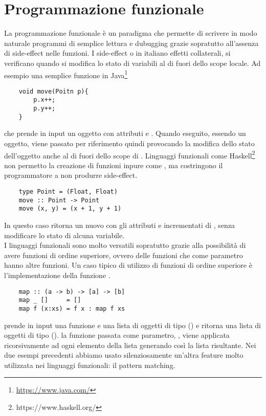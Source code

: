 \section{Programmazione funzionale}
    La programmazione funzionale è un paradigma che permette di scrivere in modo naturale programmi di semplice lettura e dubugging grazie sopratutto all'assenza di side-effect nelle funzioni.
    I side-effect o in italiano effetti collaterali, si verificano quando si modifica lo stato di variabili al di fuori dello scope locale. Ad esempio una semplice funzione in Java\footnote{\url{https://www.java.com/}}
    \begin{verbatim}
    void move(Poitn p){
        p.x++;
        p.y++;
    }
    \end{verbatim} 
    che prende in input un oggetto  con attributi  e . Quando eseguito, essendo  un oggetto, viene passato per riferimento
    quindi provocando la modifica dello stato dell'oggetto anche al di fuori dello scope di . Linguaggi funzionali come Haskell\footnote{https://www.haskell.org/} non
    permetto la creazione di funzioni inpure come , ma costringono il programmatore a non produrre side-effect.
    \begin{verbatim}
    type Point = (Float, Float)
    move :: Point -> Point
    move (x, y) = (x + 1, y + 1)
    \end{verbatim}
    In questo caso  ritorna un nuovo  con gli attributi  e  incrementati di , senza modificare lo stato di alcuna
    variabile.
    \\I linguaggi funzionali sono molto versatili sopratutto grazie alla possibilità di avere funzioni di ordine superiore, ovvero delle funzioni che come parametro
    hanno altre funzioni. Un caso tipico di utilizzo di funzioni di ordine superiore è l'implementazione della funzione .
    \begin{verbatim}
    map :: (a -> b) -> [a] -> [b]
    map _ []     = []
    map f (x:xs) = f x : map f xs
    \end{verbatim}
     prende in input una funzione  e una lista di oggetti di tipo  (\code{[a]}) e ritorna una lista di oggetti di tipo  (\code{[b]}). 
    la funzione passata come parametro, , viene applicata ricorsivamente ad ogni elemento della lista  generando così la lista risultante. 
    Nei due esempi precedenti abbiamo usato silenziosamente un'altra feature molto utilizzata nei linguaggi funzionali: il pattern matching.

